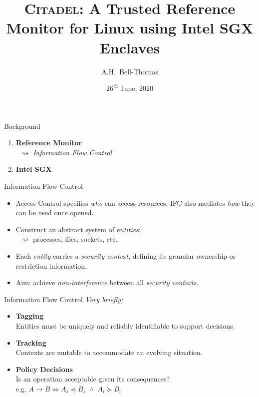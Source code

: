 \documentclass[xcolor=dvipsnames]{beamer}
\title{\textsc{Citadel}: A Trusted Reference Monitor for Linux using Intel SGX Enclaves}
\author{A.H.~Bell-Thomas}
\institute{Computer Laboratory, University of Cambridge}
\date{\scriptsize $26^{\text{th}}$ June, 2020}
\begin{document}
\frame{\titlepage}

\begin{frame}{Background}
\pause
{\large
\begin{enumerate}
    \item \textbf{Reference Monitor} \\
    \pause
    $\;\;\rightsquigarrow$ \textit{Information Flow Control}
    \pause
    \vspace{1cm}
    \item \textbf{Intel SGX}
\end{enumerate}
}
\end{frame}

\begin{frame}{Information Flow Control}
    \begin{itemize}
        \item Access Control specifics \textit{who} can access resources. IFC also mediates \textit{how} they can be used once opened.
        \vspace{5mm}
        \item Construct an abstract system of \textit{entities}; \\
        $\;\;\rightsquigarrow$ processes, files, sockets, etc.
        \vspace{5mm}
        \item Each \textit{entity} carries a \textit{security context}, defining its granular ownership or restriction information.
        \vspace{5mm}
        \item Aim: achieve \textit{non-interference} between all \textit{security contexts}.
    \end{itemize}  
\end{frame}

\begin{frame}{Information Flow Control}  
    \textit{Very briefly;}
    \vspace{3mm}
    \begin{itemize}
        \item \textbf{Tagging} \\
        Entities must be uniquely and reliably identifiable to support decisions.
        \vspace{5mm}
        \item \textbf{Tracking} \\
        Contexts are mutable to accommodate an evolving situation.
        \vspace{5mm}
        \item \textbf{Policy Decisions} \\
        Is an operation acceptable given its consequences? \\
        e.g. $A \rightarrow B \iff A_s \preceq B_s \;\land\; A_i \succeq B_i$
    \end{itemize}
\end{frame}
\end{document}
